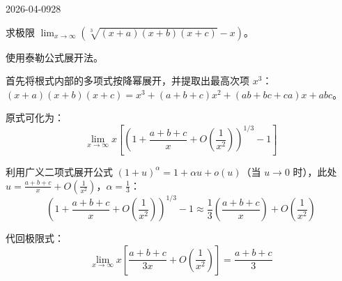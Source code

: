 \begin{mistake}{2026-04-09}{28}

\begin{problemcontent}
求极限 \( \lim_{x \to \infty} \left( \sqrt[3]{(x+a)(x+b)(x+c)} - x \right) \)。
\end{problemcontent}

\begin{solutioncontent}
使用泰勒公式展开法。

首先将根式内部的多项式按降幂展开，并提取出最高次项 \( x^3 \)：
\( (x+a)(x+b)(x+c) = x^3 + (a+b+c)x^2 + (ab+bc+ca)x + abc \)。

原式可化为：
\[
\lim_{x \to \infty} x \left[ \left(1 + \frac{a+b+c}{x} + O\left(\frac{1}{x^2}\right)\right)^{1/3} - 1 \right]
\]

利用广义二项式展开公式 \( (1+u)^{\alpha} = 1 + \alpha u + o(u) \)（当 \( u \to 0 \) 时），此处 \( u = \frac{a+b+c}{x} + O(\frac{1}{x^2}) \)，\( \alpha = \frac{1}{3} \)：
\[
\left(1 + \frac{a+b+c}{x} + O\left(\frac{1}{x^2}\right)\right)^{1/3} - 1 \approx \frac{1}{3} \left( \frac{a+b+c}{x} \right) + O\left(\frac{1}{x^2}\right)
\]

代回极限式：
\[
\lim_{x \to \infty} x \left[ \frac{a+b+c}{3x} + O\left(\frac{1}{x^2}\right) \right] = \frac{a+b+c}{3}
\]
\end{solutioncontent}


\end{mistake}
